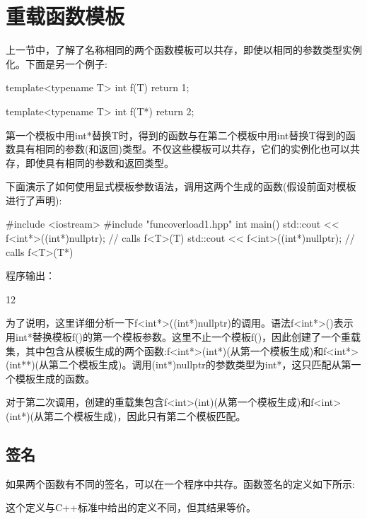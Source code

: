 \section{重载函数模板}


上一节中，了解了名称相同的两个函数模板可以共存，即使以相同的参数类型实例化。下面是另一个例子:

\begin{cpp}
template<typename T>
int f(T)
{
	return 1;
}

template<typename T>
int f(T*)
{
	return 2;
}
\end{cpp}

第一个模板中用int*替换T时，得到的函数与在第二个模板中用int替换T得到的函数具有相同的参数(和返回)类型。不仅这些模板可以共存，它们的实例化也可以共存，即使具有相同的参数和返回类型。

下面演示了如何使用显式模板参数语法，调用这两个生成的函数(假设前面对模板进行了声明):

\begin{cpp}
#include <iostream>
#include "funcoverload1.hpp"
int main()
{
	std::cout << f<int*>((int*)nullptr); // calls f<T>(T)
	std::cout << f<int>((int*)nullptr); // calls f<T>(T*)
}
\end{cpp}

程序输出：

\begin{shell}
12
\end{shell}

为了说明，这里详细分析一下f<int*>((int*)nullptr)的调用。语法f<int*>()表示用int*替换模板f()的第一个模板参数。这里不止一个模板f()，因此创建了一个重载集，其中包含从模板生成的两个函数:f<int*>(int*)(从第一个模板生成)和f<int*>(int**)(从第二个模板生成)。调用(int*)nullptr的参数类型为int*，这只匹配从第一个模板生成的函数。

对于第二次调用，创建的重载集包含f<int>(int)(从第一个模板生成)和f<int>(int*)(从第二个模板生成)，因此只有第二个模板匹配。

\subsection{签名}

如果两个函数有不同的签名，可以在一个程序中共存。函数签名的定义如下所示:

\begin{notice}
这个定义与C++标准中给出的定义不同，但其结果等价。
\end{notice}

